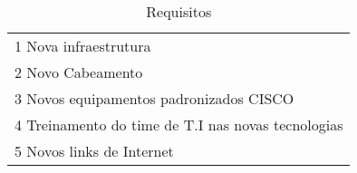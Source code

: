 \begin{table}[h!] %
\centering
\caption{Requisitos}
\label{tab4} %
\begin{tabular}{l}
{\color[HTML]{000000} 1 Nova infraestrutura}                              \\
{\color[HTML]{000000} 2 Novo Cabeamento}                                  \\
{\color[HTML]{000000} 3 Novos equipamentos padronizados CISCO}            \\
{\color[HTML]{000000} 4 Treinamento do time de T.I nas novas tecnologias} \\
{\color[HTML]{000000} 5 Novos links de Internet}                         
\end{tabular}
\end{table}